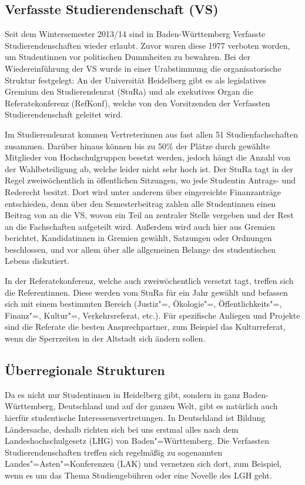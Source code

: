 \vspace{-2mm}
\subsection{Verfasste Studierendenschaft (VS)}
Seit dem Wintersemester 2013/14 sind in Baden-Württemberg Verfasste Studierendenschaften wieder erlaubt.
Zuvor waren diese 1977 verboten worden, um Studentinnen vor politischen Dummheiten zu bewahren.
Bei der Wiedereinführung der VS wurde in einer Urabstimmung die organisatorische Struktur festgelegt:
An der Universität Heidelberg gibt es als legislatives Gremium den Studierendenrat (StuRa) und als exekutives Organ die Referatekonferenz (RefKonf), welche von den Vorsitzenden der Verfassten Studierendenschaft geleitet wird.

Im Studierendenrat kommen Vertreterinnen aus fast allen 51 Studienfachschaften zusammen.
Darüber hinaus können bis zu 50\% der Plätze durch gewählte Mitglieder von Hochschulgruppen besetzt werden, jedoch hängt die Anzahl von der Wahlbeteiligung ab, welche leider nicht sehr hoch ist.
Der StuRa tagt in der Regel zweiwöchentlich in öffentlichen Sitzungen, wo jede Studentin Antrags- und Rederecht besitzt.
Dort wird unter anderem über eingereichte Finanzanträge entschieden, denn über den Semesterbeitrag zahlen alle Studentinnen einen Beitrag von \EUR{\vsbeitrag} an die VS, wovon ein Teil an zentraler Stelle vergeben und der Rest an die Fachschaften aufgeteilt wird.
Außerdem wird auch hier aus Gremien berichtet, Kandidatinnen in Gremien gewählt, Satzungen oder Ordnungen beschlossen, und vor allem über alle allgemeinen Belange des studentischen Lebens diskutiert.

In der Referatekonferenz, welche auch zweiwöchentlich versetzt tagt, treffen sich die Referentinnen.
Diese werden vom StuRa für ein Jahr gewählt und befassen sich mit einem bestimmten Bereich (Justiz"=, Ökologie"=, Öffentlichkeits"=, Finanz"=, Kultur"=, Verkehrsreferat, etc.).
Für spezifische Anliegen und Projekte sind die Referate die besten Ansprechpartner, zum Beispiel das Kulturreferat, wenn die Sperrzeiten in der Altstadt sich ändern sollen.

\subsection{Überregionale Strukturen}
Da es nicht nur Studentinnen in Heidelberg gibt, sondern in ganz Baden-Württemberg, Deutschland und auf der ganzen Welt, gibt es natürlich auch hierfür studentische Interessensvertretungen.
In Deutschland ist Bildung Ländersache, deshalb richten sich bei uns erstmal alles nach dem Landeshochschulgesetz (LHG) von Baden"=Württemberg.
Die Verfassten Studierendenschaften treffen sich regelmäßig zu sogenannten Landes"=Asten"=Konferenzen (LAK) und vernetzen sich dort, zum Beispiel, wenn es um das Thema Studiengebühren oder eine Novelle des LGH geht.

